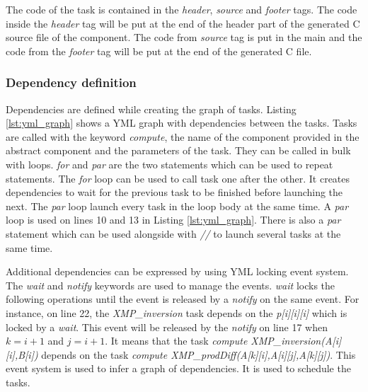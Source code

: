 The code of the task is contained in the \textit{header}, \textit{source} and \textit{footer} tags.
The code inside the \textit{header} tag will be put at the end of the header part of the generated C source file of the component.
The code from \textit{source} tag is put in the main and the code from the \textit{footer} tag will be put at the end of the generated C file.

\subsubsection{Dependency definition}
Dependencies are defined while creating the graph of tasks.
Listing \ref{lst:yml_graph} shows a YML graph with dependencies between the tasks.
Tasks are called with the keyword \textit{compute}, the name of the component provided in the abstract component and the parameters of the task.
They can be called in bulk with loops.
\textit{for} and \textit{par} are the two statements which can be used to repeat statements.
The \textit{for} loop can be used to call task one after the other.
It creates dependencies to wait for the previous task to be finished before launching the next.
The \textit{par} loop launch every task in the loop body at the same time.
A \textit{par} loop is used on lines 10 and 13 in Listing \ref{lst:yml_graph}.
There is also a \textit{par} statement which can be used alongside with \textit{//} to launch several tasks at the same time.

Additional dependencies can be expressed by using YML locking event system.
The \textit{wait} and \textit{notify} keywords are used to manage the events.
\textit{wait} locks the following operations until the event is released by a \textit{notify} on the same event.
For instance, on line 22, the \textit{XMP\_inversion} task depends on the \textit{p[i][i][i]} which is locked by a \textit{wait}.
This event will be released by the \textit{notify} on line 17 when $k = i + 1$ and $j= i + 1$.
It means that the task \textit{compute XMP\_inversion(A[i][i],B[i])} depends on the task \textit{compute XMP\_prodDiff(A[k][i],A[i][j],A[k][j])}.
This event system is used to infer a graph of dependencies.
It is used to schedule the tasks.

\begin{figure}

\end{figure}

